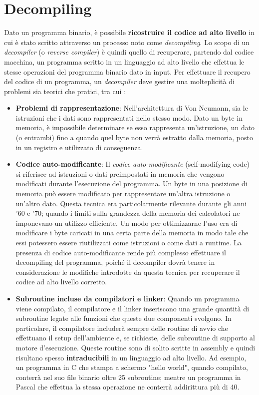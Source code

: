 \documentclass[../main.tex]{subfiles}
\begin{document}
\section{Decompiling}
Dato un programma binario, è possibile \textbf{ricostruire il codice ad alto livello} in cui è stato scritto attraverso un processo noto come \textit{decompiling}.
Lo scopo di un \textit{decompiler} (o \textit{reverse compiler}) è quindi quello di recuperare, partendo dal codice macchina, un programma scritto in un linguaggio ad alto livello che effettua le stesse
operazioni del programma binario dato in input. Per effettuare il recupero del codice di un programma, un \textit{decompiler} deve gestire una molteplicità di problemi sia teorici che pratici, tra cui \cite{Cifuentes1994ReverseCT}:
\begin{itemize}
    \item \textbf{Problemi di rappresentazione}: Nell'architettura di Von Neumann, sia le istruzioni che i dati sono rappresentati nello stesso modo. Dato un byte in memoria, è impossibile determinare se esso rappresenta un'istruzione, un dato (o entrambi) fino a quando quel byte non verrà estratto dalla memoria, posto in un registro e utilizzato di conseguenza.
    \item \textbf{Codice auto-modificante}: Il \textit{codice auto-modificante} (self-modifying code) si riferisce ad istruzioni o dati preimpostati in memoria che vengono modificati durante l'esecuzione del programma. Un byte in una posizione di memoria può essere modificato per rappresentare un'altra istruzione o un'altro dato. Questa tecnica era particolarmente rilevante durante gli anni '60 e '70; quando
    i limiti sulla grandezza della memoria dei calcolatori ne imponevano un utilizzo efficiente. Un modo per ottimizzarne l'uso era di modificare i byte caricati in una certa parte della memoria in modo tale che essi potessero essere riutilizzati come istruzioni o come dati a runtime. La presenza di codice auto-modificante rende più complesso effettuare il decompiling del programma, poiché il decompiler
    dovrà tenere in considerazione le modifiche introdotte da questa tecnica per recuperare il codice ad alto livello corretto.
    \item \textbf{Subroutine incluse da compilatori e linker}: Quando un programma viene compilato, il compilatore e il linker inseriscono una grande quantità di subroutine legate alle funzioni che queste due componenti svolgono.
    In particolare, il compilatore includerà sempre delle routine di avvio che effettuano il setup dell'ambiente e, se richieste, delle subroutine di supporto al motore d'esecuzione. 
    Queste routine sono di solito scritte in assembly e quindi risultano spesso \textbf{intraducibili} in un linguaggio ad alto livello. 
    Ad esempio, un programma in C che stampa a schermo "hello world", quando compilato, conterrà nel suo file binario oltre 25 subroutine; 
    mentre un programma in Pascal che effettua la stessa operazione ne conterrà addirittura più di 40.
\end{itemize}
\end{document}
